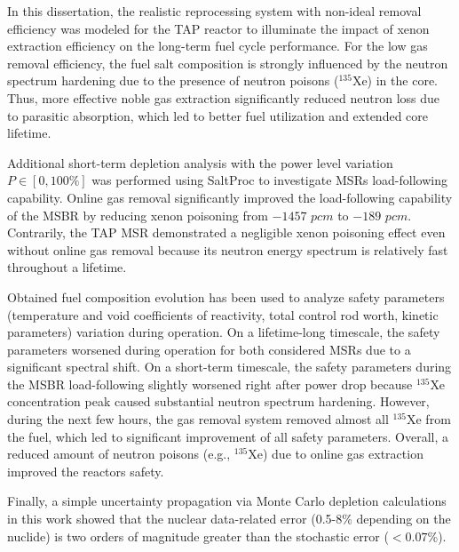 In this dissertation, the realistic reprocessing system with non-ideal 
removal efficiency was modeled for the TAP reactor to illuminate the impact of 
xenon extraction efficiency on the long-term fuel cycle performance. For the 
low gas removal efficiency, the fuel salt composition is strongly influenced 
by the neutron spectrum hardening due to the presence of neutron poisons 
($^{135}$Xe) in the core. Thus, more effective noble gas extraction 
significantly reduced neutron loss due to parasitic absorption, which led to 
better fuel utilization and extended core lifetime. 

Additional short-term depletion analysis with the power level variation 
$P\in[0,100\%]$ was performed using SaltProc to investigate \glspl{MSR} 
load-following capability. Online gas removal 
significantly improved the load-following capability of the \gls{MSBR} by 
reducing xenon poisoning from $-1457$ $pcm$ to $-189$ $pcm$. Contrarily, the 
\gls{TAP} \gls{MSR} demonstrated a negligible xenon poisoning effect even 
without online gas removal because its neutron energy spectrum is relatively 
fast throughout a lifetime.

Obtained fuel composition evolution has been used to analyze safety parameters 
(temperature and void coefficients of reactivity, total control rod worth, 
kinetic parameters) variation during operation. On a lifetime-long timescale, 
the safety parameters worsened during operation for both considered 
\glspl{MSR} due to a significant spectral shift. On a short-term timescale, 
the safety parameters during the \gls{MSBR} load-following slightly worsened 
right after power drop because $^{135}$Xe concentration peak caused 
substantial neutron spectrum hardening. However, during the next few hours, 
the gas removal system removed almost all $^{135}$Xe from the fuel, which led 
to significant improvement of all safety parameters. Overall, a reduced amount 
of neutron poisons (e.g., $^{135}$Xe) due to online gas extraction improved 
the reactors safety.

Finally, a simple uncertainty propagation via Monte Carlo depletion 
calculations in this work showed that the nuclear data-related error (0.5-8\% 
depending on the nuclide) is two orders of magnitude greater than the 
stochastic error ($<0.07$\%).
